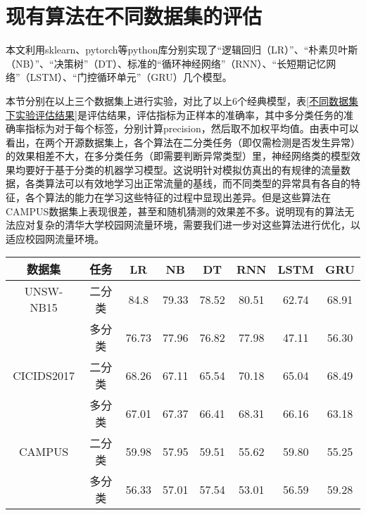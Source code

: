 \section{现有算法在不同数据集的评估}
本文利用sklearn、pytorch等python库分别实现了“逻辑回归（LR）”、“朴素贝叶斯（NB）”、“决策树”（DT）、标准的“循环神经网络”（RNN）、“长短期记忆网络”（LSTM）、“门控循环单元”（GRU）几个模型。

本节分别在以上三个数据集上进行实验，对比了以上6个经典模型，表\ref{不同数据集下实验评估结果}是评估结果，评估指标为正样本的准确率，其中多分类任务的准确率指标为对于每个标签，分别计算precision，然后取不加权平均值。由表中可以看出，在两个开源数据集上，各个算法在二分类任务（即仅需检测是否发生异常）的效果相差不大，在多分类任务（即需要判断异常类型）里，神经网络类的模型效果均要好于基于分类的机器学习模型。这说明针对模拟仿真出的有规律的流量数据，各类算法可以有效地学习出正常流量的基线，而不同类型的异常具有各自的特征，各个算法的能力在学习这些特征的过程中显现出差异。但是这些算法在CAMPUS数据集上表现很差，甚至和随机猜测的效果差不多。说明现有的算法无法应对复杂的清华大学校园网流量环境，需要我们进一步对这些算法进行优化，以适应校园网流量环境。




\begin{table*}[h]
    \small
    \caption{不同数据集下实验评估结果}
    \label{不同数据集下实验评估结果}
    \centering
    \begin{tabular}{c|c|ccc|ccc}
    \toprule
    
     数据集 &  任务  &  
     LR &  NB & DT & RNN & LSTM & GRU  \\
    \midrule
    
    UNSW-NB15 & 二分类 & 84.8 & 79.33 & 78.52 &  80.51 & 62.74 & 68.91  \\ 
    
    & 多分类 &76.73 & 77.96 & 76.82 & 77.98 & 47.11 & 56.30  \\
    
    \midrule
    CICIDS2017 & 二分类 & 68.26 & 67.11 & 65.54 & 70.18 & 65.04 & 68.49  \\
    & 多分类 & 67.01 & 67.37 & 66.41 & 68.31 & 66.16 & 63.18 \\
    \midrule
    CAMPUS & 二分类 & 59.98 & 57.95 & 59.51 & 55.62 & 59.80 & 55.25 \\
    & 多分类 & 56.33 & 57.01 & 57.54 & 53.01 & 56.59 & 59.28 \\
   
     \bottomrule
    
    \end{tabular}
    \end{table*}
